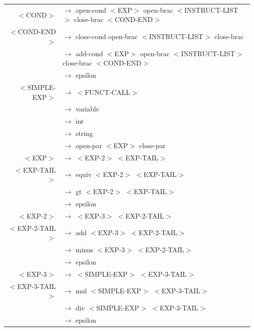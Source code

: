 \documentclass[a4paper,10pt]{article}
\begin{document}
\begin{tabular}{rl}
	$<$COND$>$					& $\rightarrow$ open-cond $<$EXP$>$ open-brac $<$INSTRUCT-LIST$>$ close-brac $<$COND-END$>$ \\
	$<$COND-END$>$				& $\rightarrow$ close-cond open-brac $<$INSTRUCT-LIST$>$ close-brac \\
								& $\rightarrow$ add-cond $<$EXP$>$ open-brac $<$INSTRUCT-LIST$>$ close-brac $<$COND-END$>$ \\
								& $\rightarrow$ epsilon \\
	$<$SIMPLE-EXP$>$			& $\rightarrow$ $<$FUNCT-CALL$>$ \\
								& $\rightarrow$ variable \\
								& $\rightarrow$ int \\
								& $\rightarrow$ string \\
								& $\rightarrow$ open-par $<$EXP$>$ close-par \\
	$<$EXP$>$					& $\rightarrow$ $<$EXP-2$>$ $<$EXP-TAIL$>$ \\
	$<$EXP-TAIL$>$				& $\rightarrow$ equiv $<$EXP-2$>$ $<$EXP-TAIL$>$ \\
								& $\rightarrow$ gt $<$EXP-2$>$ $<$EXP-TAIL$>$ \\
								& $\rightarrow$ epsilon \\
	$<$EXP-2$>$					& $\rightarrow$ $<$EXP-3$>$ $<$EXP-2-TAIL$>$ \\
	$<$EXP-2-TAIL$>$			& $\rightarrow$ add $<$EXP-3$>$ $<$EXP-2-TAIL$>$ \\
								& $\rightarrow$ minus $<$EXP-3$>$ $<$EXP-2-TAIL$>$ \\
								& $\rightarrow$ epsilon \\
	$<$EXP-3$>$					& $\rightarrow$ $<$SIMPLE-EXP$>$ $<$EXP-3-TAIL$>$ \\
	$<$EXP-3-TAIL$>$			& $\rightarrow$ mul $<$SIMPLE-EXP$>$ $<$EXP-3-TAIL$>$ \\
								& $\rightarrow$ div $<$SIMPLE-EXP$>$ $<$EXP-3-TAIL$>$ \\
								& $\rightarrow$ epsilon \\
					
					
\end{tabular}











\pagebreak
\end{document}
